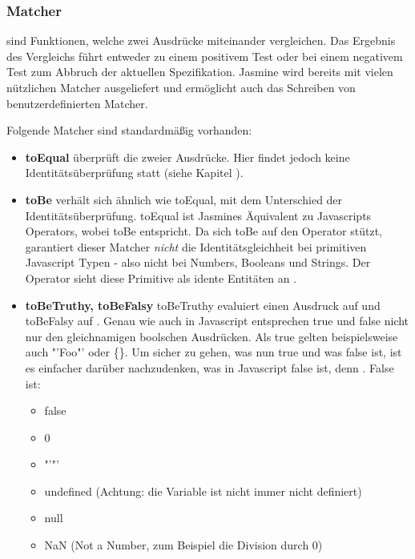 \subsubsection{Matcher}
 sind Funktionen, welche zwei Ausdrücke miteinander vergleichen. Das Ergebnis des Vergleichs führt entweder zu einem positivem Test oder bei einem negativem Test zum Abbruch der aktuellen Spezifikation. Jasmine wird bereits mit vielen nützlichen Matcher ausgeliefert und ermöglicht auch das Schreiben von benutzerdefinierten Matcher.

Folgende Matcher sind standardmäßig vorhanden:

\begin{itemize}
  \item \textbf{toEqual} überprüft die  zweier Ausdrücke. Hier findet jedoch keine Identitätsüberprüfung statt (siehe Kapitel ).

  \item \textbf{toBe} verhält sich ähnlich wie toEqual, mit dem Unterschied der Identitätsüberprüfung. toEqual ist Jasmines Äquivalent zu Javascripts \glqq{==\grqq} Operators, wobei toBe \glqq{===\grqq} entspricht. Da sich toBe auf den \glqq{===\grqq} Operator stützt, garantiert dieser Matcher \textit{nicht} die Identitätsgleichheit bei primitiven Javascript Typen - also nicht bei Numbers, Booleans und Strings. Der \glqq{===\grqq} Operator sieht diese Primitive als idente Entitäten an \autocite[16]{Hahn:2013}.

  \item \textbf{toBeTruthy, toBeFalsy}\newline
  toBeTruthy evaluiert einen Ausdruck auf  und toBeFalsy auf . Genau wie auch in Javascript entsprechen true und false nicht nur den gleichnamigen boolschen Ausdrücken. Als true gelten beispielsweise auch "'Foo"' oder \{\}. Um sicher zu gehen, was nun true und was false ist, ist es einfacher darüber nachzudenken, was in Javascript false ist, denn  \autocite[17]{Hahn:2013}.
  False ist:
    \begin{itemize}
      \item false
      \item 0
      \item "'"'
      \item undefined (Achtung: die Variable  ist nicht immer nicht definiert)
      \item null
      \item NaN (Not a Number, zum Beispiel die Division durch 0)
    \end{itemize}


\end{itemize}
